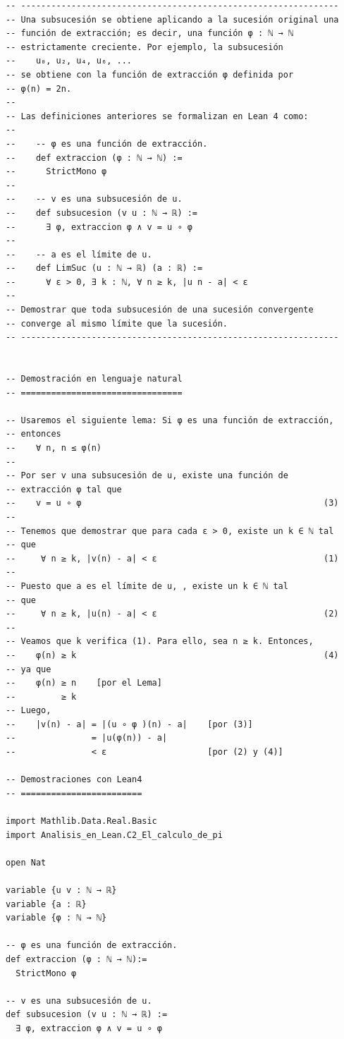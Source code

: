 \begin{verbatim}
-- ---------------------------------------------------------------
-- Una subsucesión se obtiene aplicando a la sucesión original una
-- función de extracción; es decir, una función φ : ℕ → ℕ
-- estrictamente creciente. Por ejemplo, la subsucesión
--    u₀, u₂, u₄, u₆, ...
-- se obtiene con la función de extracción φ definida por
-- φ(n) = 2n.
--
-- Las definiciones anteriores se formalizan en Lean 4 como:
--
--    -- φ es una función de extracción.
--    def extraccion (φ : ℕ → ℕ) :=
--      StrictMono φ
--
--    -- v es una subsucesión de u.
--    def subsucesion (v u : ℕ → ℝ) :=
--      ∃ φ, extraccion φ ∧ v = u ∘ φ
--
--    -- a es el límite de u.
--    def LimSuc (u : ℕ → ℝ) (a : ℝ) :=
--      ∀ ε > 0, ∃ k : ℕ, ∀ n ≥ k, |u n - a| < ε
--
-- Demostrar que toda subsucesión de una sucesión convergente
-- converge al mismo límite que la sucesión.
-- ---------------------------------------------------------------


-- Demostración en lenguaje natural
-- ================================

-- Usaremos el siguiente lema: Si φ es una función de extracción,
-- entonces
--    ∀ n, n ≤ φ(n)
--
-- Por ser v una subsucesión de u, existe una función de
-- extracción φ tal que
--    v = u ∘ φ                                                (3)
--
-- Tenemos que demostrar que para cada ε > 0, existe un k ∈ ℕ tal
-- que
--     ∀ n ≥ k, |v(n) - a| < ε                                 (1)
--
-- Puesto que a es el límite de u, , existe un k ∈ ℕ tal
-- que
--     ∀ n ≥ k, |u(n) - a| < ε                                 (2)
--
-- Veamos que k verifica (1). Para ello, sea n ≥ k. Entonces,
--    φ(n) ≥ k                                                 (4)
-- ya que
--    φ(n) ≥ n    [por el Lema]
--         ≥ k
-- Luego,
--    |v(n) - a| = |(u ∘ φ )(n) - a|    [por (3)]
--               = |u(φ(n)) - a|
--               < ε                    [por (2) y (4)]

-- Demostraciones con Lean4
-- ========================

import Mathlib.Data.Real.Basic
import Analisis_en_Lean.C2_El_calculo_de_pi

open Nat

variable {u v : ℕ → ℝ}
variable {a : ℝ}
variable {φ : ℕ → ℕ}

-- φ es una función de extracción.
def extraccion (φ : ℕ → ℕ):=
  StrictMono φ

-- v es una subsucesión de u.
def subsucesion (v u : ℕ → ℝ) :=
  ∃ φ, extraccion φ ∧ v = u ∘ φ


\end{verbatim}
